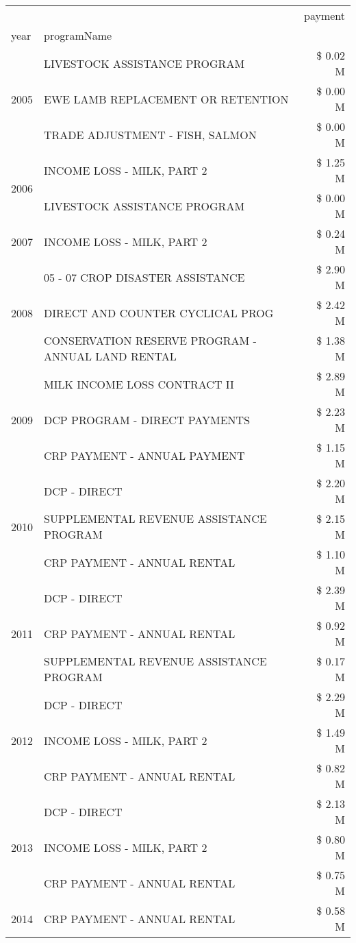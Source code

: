 \begin{tabular}{llr}
\toprule
 &  & payment \\
year & programName &  \\
\midrule
\multirow[t]{3}{*}{2005} & LIVESTOCK ASSISTANCE PROGRAM & \$ 0.02 M \\
 & EWE LAMB REPLACEMENT OR RETENTION & \$ 0.00 M \\
 & TRADE ADJUSTMENT - FISH, SALMON & \$ 0.00 M \\
\cline{1-3}
\multirow[t]{2}{*}{2006} & INCOME LOSS - MILK, PART 2 & \$ 1.25 M \\
 & LIVESTOCK ASSISTANCE PROGRAM & \$ 0.00 M \\
\cline{1-3}
2007 & INCOME LOSS - MILK, PART 2 & \$ 0.24 M \\
\cline{1-3}
\multirow[t]{3}{*}{2008} & 05 - 07 CROP DISASTER ASSISTANCE & \$ 2.90 M \\
 & DIRECT AND COUNTER CYCLICAL PROG & \$ 2.42 M \\
 & CONSERVATION RESERVE PROGRAM - ANNUAL LAND RENTAL & \$ 1.38 M \\
\cline{1-3}
\multirow[t]{3}{*}{2009} & MILK INCOME LOSS CONTRACT II & \$ 2.89 M \\
 & DCP PROGRAM - DIRECT PAYMENTS & \$ 2.23 M \\
 & CRP PAYMENT - ANNUAL PAYMENT & \$ 1.15 M \\
\cline{1-3}
\multirow[t]{3}{*}{2010} & DCP - DIRECT & \$ 2.20 M \\
 & SUPPLEMENTAL REVENUE ASSISTANCE PROGRAM & \$ 2.15 M \\
 & CRP PAYMENT - ANNUAL RENTAL & \$ 1.10 M \\
\cline{1-3}
\multirow[t]{3}{*}{2011} & DCP - DIRECT & \$ 2.39 M \\
 & CRP PAYMENT - ANNUAL RENTAL & \$ 0.92 M \\
 & SUPPLEMENTAL REVENUE ASSISTANCE PROGRAM & \$ 0.17 M \\
\cline{1-3}
\multirow[t]{3}{*}{2012} & DCP - DIRECT & \$ 2.29 M \\
 & INCOME LOSS - MILK, PART 2 & \$ 1.49 M \\
 & CRP PAYMENT - ANNUAL RENTAL & \$ 0.82 M \\
\cline{1-3}
\multirow[t]{3}{*}{2013} & DCP - DIRECT & \$ 2.13 M \\
 & INCOME LOSS - MILK, PART 2 & \$ 0.80 M \\
 & CRP PAYMENT - ANNUAL RENTAL & \$ 0.75 M \\
\cline{1-3}
\multirow[t]{3}{*}{2014} & CRP PAYMENT - ANNUAL RENTAL & \$ 0.58 M \\

\end{tabular}
